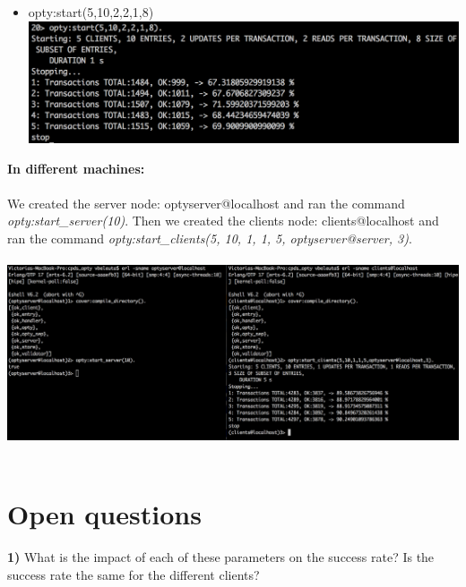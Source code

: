 \documentclass[a4paper, 11pt]{article}
\begin{document}
\begin{itemize}
\item opty:start(5,10,2,2,1,8)\\
\includegraphics[scale=0.5]{images/exp-v-5.png} \\
\end{itemize}

\textbf{In different machines:}\\\\

We created the server node: optyserver@localhost and ran the command \textit{opty:start\_server(10)}. Then we created the clients node: clients@localhost and ran the command \textit{opty:start\_clients(5, 10, 1, 1, 5, optyserver@server, 3)}.\\\\
\includegraphics[scale=0.39]{images/distributed.png} \\\\

\newpage
\section{Open questions}

\textbf{1)} What is the impact of each of these parameters on the success rate? Is the success rate the same for the different clients?\\
\end{document}
